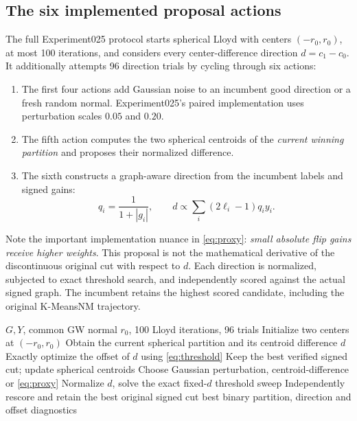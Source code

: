 \subsection{The six implemented proposal actions}
The full Experiment025 protocol starts spherical Lloyd with centers $(-r_0,r_0)$, at most 100 iterations, and considers every center-difference direction $d=c_1-c_0$. It additionally attempts 96 direction trials by cycling through six actions:
\begin{enumerate}
\item The first four actions add Gaussian noise to an incumbent good direction or a fresh random normal. Experiment025's paired implementation uses perturbation scales $0.05$ and $0.20$.
\item The fifth action computes the two spherical centroids of the \emph{current winning partition} and proposes their normalized difference.
\item The sixth constructs a graph-aware direction from the incumbent labels and signed gains:
\begin{equation}\label{eq:proxy}
q_i=\frac{1}{1+|g_i|},\qquad
d\propto\sum_i(2\ell_i-1)q_i y_i.
\end{equation}
\end{enumerate}
Note the important implementation nuance in \eqref{eq:proxy}: \emph{small absolute flip gains receive higher weights}. This proposal is not the mathematical derivative of the discontinuous original cut with respect to $d$. Each direction is normalized, subjected to exact threshold search, and independently scored against the actual signed graph. The incumbent retains the highest scored candidate, including the original K-MeansNM trajectory.

\begin{algorithm}[tb]
\caption{Cut-aware spherical K-Means and threshold search}\label{alg:cutaware}
\begin{algorithmic}[1]
\Require $G,Y$, common GW normal $r_0$, 100 Lloyd iterations, 96 trials
\State Initialize two centers at $(-r_0,r_0)$
 \State Obtain the current spherical partition and its centroid difference $d$
 \State Exactly optimize the offset of $d$ using \eqref{eq:threshold}
 \State Keep the best verified signed cut; update spherical centroids
\EndFor
{}
 \State Choose Gaussian perturbation, centroid-difference or \eqref{eq:proxy}
 \State Normalize $d$, solve the exact fixed-$d$ threshold sweep
 \State Independently rescore and retain the best original signed cut
\EndFor
\State \Return best binary partition, direction and offset diagnostics
\end{algorithmic}
\end{algorithm}

